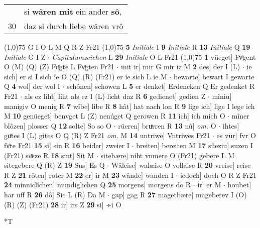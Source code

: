 \documentclass[8pt,a4paper,notitlepage]{article}
\begin{document}
\begin{table}[ht]
\begin{minipage}[t]{0.5\linewidth}
\begin{tabular}{rl}
 & si \textbf{wâren mit} ein ander \textbf{sô},\\ 
30 & daz si durch liebe wâren vrô\\ 
\end{tabular}
\scriptsize
\line(1,0){75} \newline
G I O L M Q R Z Fr21 \newline
\line(1,0){75} \newline
\textbf{5} \textit{Initiale} I  \textbf{9} \textit{Initiale} R  \textbf{13} \textit{Initiale} Q  \textbf{19} \textit{Initiale} G I Z   $\cdot$ \textit{Capitulumzeichen} L  \textbf{29} \textit{Initiale} O L Fr21  \newline
\line(1,0){75} \newline
\textbf{1} vüeget] Fvͦgent O (M) (Q) (Z) Fuͯgte L Fvͦgten Fr21  $\cdot$ mit ir] mir G mir iz M \textbf{2} des] der I (L)  $\cdot$ ie sich] er si I sich îe O (Q) (R) (Fr21) er ie sich L ie M  $\cdot$ bewarte] bewart I gewarte Q \textbf{4} wol] der wol I  $\cdot$ schônen] schowen L \textbf{5} er denket] Erdencken Q Er gedenket R Fr21  $\cdot$ als ez lîht] liht als ez I (L) licht daz R \textbf{6} gedienet] gedien Z  $\cdot$ mîniu] manigiv O menig R \textbf{7} wîbe] libe R \textbf{8} hât] hat nach lon R \textbf{9} lige ich] lige I lege ich M \textbf{10} genüeget] benvget L (Z) nenúget Q gerowen R \textbf{11} ich] ich mich O  $\cdot$ mîner blôzen] plosser Q \textbf{12} solte] So so O  $\cdot$ rüeren] bruͯrren R \textbf{13} nû] \textit{om.} O  $\cdot$ ihtes] guͤtes I (L) gites O Q (R) Z Fr21 \textit{om.} M \textbf{14} untriwe] Vntriwes Fr21  $\cdot$ es vür] fvr O fvͦre Fr21 \textbf{15} si] sin R \textbf{16} beider] zweier I  $\cdot$ breiten] bereiten M \textbf{17} süeziu] suzen I (Fr21) suͯsze R \textbf{18} sint] Sit M  $\cdot$ sitebære] niht vnmere O (Fr21) gebere L M sitegebere Q (R) Z \textbf{19} Sus] Es Q  $\cdot$ Wâleise] walæise O vollaise R \textbf{20} vreise] reise R Z \textbf{21} rôten] roter M \textbf{22} er] ir M \textbf{23} wânde] wanden I  $\cdot$ iedoch] doch O R Z Fr21 \textbf{24} minniclîchen] mundiglichen Q \textbf{25} morgens] morgens do R  $\cdot$ ir] er M  $\cdot$ houbet] har uff R \textbf{26} dô] Sie L (R) Da M  $\cdot$ gap] gag R \textbf{27} magetbære] mageberev I (O) (R) (Z) (Fr21) \textbf{28} ir] irs Z \textbf{29} si] ÷i O \newline
\end{minipage}
\hspace{0.5cm}
\begin{minipage}[t]{0.5\linewidth}
\small
\begin{center}*T

\end{center}
\end{minipage}
\end{table}
\end{document}
